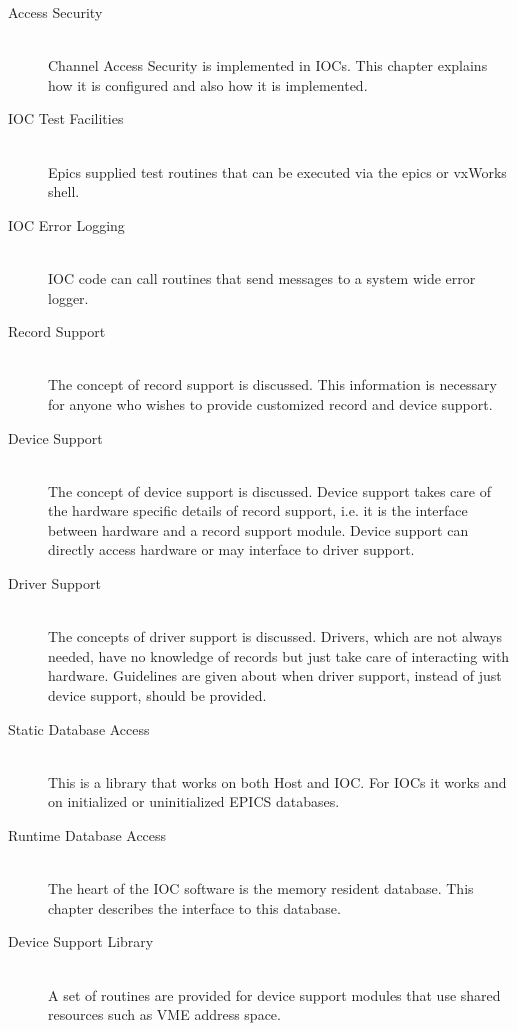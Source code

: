 \begin{description}
\item[Access Security] \hfill \\
Channel Access Security is implemented in IOCs. This chapter explains how it is configured and also how it is 
implemented.

\item[IOC Test Facilities] \hfill \\
Epics supplied test routines that can be executed via the epics or vxWorks shell.

\item[IOC Error Logging] \hfill \\
IOC code can call routines that send messages to a system wide error logger.

\item[Record Support] \hfill \\
The concept of record support is discussed. This information is necessary for anyone who wishes to provide 
customized record and device support.

\item[Device Support] \hfill \\
The concept of device support is discussed. Device support takes care of the hardware specific details of record 
support, i.e. it is the interface between hardware and a record support module. Device support can directly access 
hardware or may interface to driver support.

\item[Driver Support] \hfill \\
The concepts of driver support is discussed. Drivers, which are not always needed, have no knowledge of records 
but just take care of interacting with hardware. Guidelines are given about when driver support, instead of just 
device support, should be provided.

\item[Static Database Access] \hfill \\
This is a library that works on both Host and IOC. For IOCs it works and on initialized or uninitialized EPICS 
databases.

\item[Runtime Database Access] \hfill \\
The heart of the IOC software is the memory resident database. This chapter describes the interface to this 
database.

\item[Device Support Library] \hfill \\
A set of routines are provided for device support modules that use shared resources such as VME address space.


\end{description}
